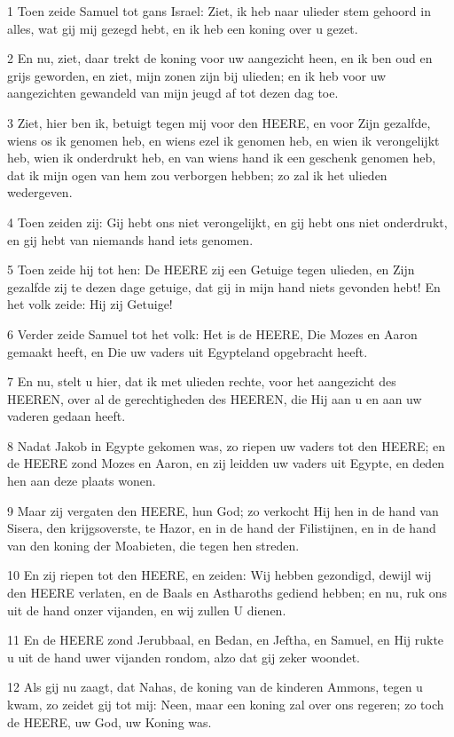 \par 1 Toen zeide Samuel tot gans Israel: Ziet, ik heb naar ulieder stem gehoord in alles, wat gij mij gezegd hebt, en ik heb een koning over u gezet.
\par 2 En nu, ziet, daar trekt de koning voor uw aangezicht heen, en ik ben oud en grijs geworden, en ziet, mijn zonen zijn bij ulieden; en ik heb voor uw aangezichten gewandeld van mijn jeugd af tot dezen dag toe.
\par 3 Ziet, hier ben ik, betuigt tegen mij voor den HEERE, en voor Zijn gezalfde, wiens os ik genomen heb, en wiens ezel ik genomen heb, en wien ik verongelijkt heb, wien ik onderdrukt heb, en van wiens hand ik een geschenk genomen heb, dat ik mijn ogen van hem zou verborgen hebben; zo zal ik het ulieden wedergeven.
\par 4 Toen zeiden zij: Gij hebt ons niet verongelijkt, en gij hebt ons niet onderdrukt, en gij hebt van niemands hand iets genomen.
\par 5 Toen zeide hij tot hen: De HEERE zij een Getuige tegen ulieden, en Zijn gezalfde zij te dezen dage getuige, dat gij in mijn hand niets gevonden hebt! En het volk zeide: Hij zij Getuige!
\par 6 Verder zeide Samuel tot het volk: Het is de HEERE, Die Mozes en Aaron gemaakt heeft, en Die uw vaders uit Egypteland opgebracht heeft.
\par 7 En nu, stelt u hier, dat ik met ulieden rechte, voor het aangezicht des HEEREN, over al de gerechtigheden des HEEREN, die Hij aan u en aan uw vaderen gedaan heeft.
\par 8 Nadat Jakob in Egypte gekomen was, zo riepen uw vaders tot den HEERE; en de HEERE zond Mozes en Aaron, en zij leidden uw vaders uit Egypte, en deden hen aan deze plaats wonen.
\par 9 Maar zij vergaten den HEERE, hun God; zo verkocht Hij hen in de hand van Sisera, den krijgsoverste, te Hazor, en in de hand der Filistijnen, en in de hand van den koning der Moabieten, die tegen hen streden.
\par 10 En zij riepen tot den HEERE, en zeiden: Wij hebben gezondigd, dewijl wij den HEERE verlaten, en de Baals en Astharoths gediend hebben; en nu, ruk ons uit de hand onzer vijanden, en wij zullen U dienen.
\par 11 En de HEERE zond Jerubbaal, en Bedan, en Jeftha, en Samuel, en Hij rukte u uit de hand uwer vijanden rondom, alzo dat gij zeker woondet.
\par 12 Als gij nu zaagt, dat Nahas, de koning van de kinderen Ammons, tegen u kwam, zo zeidet gij tot mij: Neen, maar een koning zal over ons regeren; zo toch de HEERE, uw God, uw Koning was.
